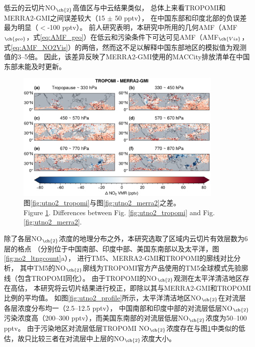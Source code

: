 低云的云切片NO$_{\ch{2}}$高值区与中云结果类似，
总体上来看TROPOMI和MERRA2-GMI之间误差较大（15 $\pm$ 50 pptv），
在中国东部和印度北部的负误差最为明显（$<$-100 pptv）。
前人研究表明，本研究中所用的几何AMF（AMF$_{\ch{geo}}$，式\ref{eq:AMF_geo}）在低云和污染条件下可达可见AMF（AMF$_{\ch{Vis}}$，式\ref{eq:AMF_NO2Vis}）的两倍\citep{BelmonteRivas.2015}，然而这不足以解释中国东部地区的模拟值为观测值的3--5倍。
因此，该差异反映了MERRA2-GMI使用的MACCity排放清单在中国东部未能及时更新。


\begin{figure}[H]
    \centering
    \includegraphics[width=0.9\textwidth]{./figures/utno2_delta.png}
    \caption{
    图\ref{fig:utno2_tropomi}与图\ref{fig:utno2_merra2}之差。 \\
    Figure \ref{fig:utno2_delta}. Differences between Fig. \ref{fig:utno2_tropomi} and Fig. \ref{fig:utno2_merra2}.
    }
    \label{fig:utno2_delta}
\end{figure}



除了各层NO$_{\ch{2}}$浓度的地理分布之外，本研究选取了区域内云切片有效层数为6层的格点
（分别位于中国南部、印度中部、美国东南部以及太平洋，图\ref{fig:no2_ltngcount}a），
进行TM5、MERRA2-GMI和TROPOMI的廓线对比分析，
其中TM5的NO$_{\ch{2}}$廓线为TROPOMI官方产品使用的TM5全球模式先验廓线（包含TROPOMI同化）。
由于TROPOMI的NO$_{\ch{2}}$观测在太平洋清洁地区存在高估，
本研究将云切片结果进行校正，即除以其与MERRA2-GMI和TROPOMI比例的平均值。
如图\ref{fig:utno2_profile}所示，太平洋清洁地区NO$_{\ch{2}}$在对流层各层浓度分布均一（2.5--12.5 pptv），
中国南部和印度中部的对流层低层NO$_{\ch{2}}$污染浓度高（200--300 pptv），而美国东南部的对流层低层NO$_{\ch{2}}$浓度为50--100 pptv。
由于污染地区对流层低层TROPOMI NO$_{\ch{2}}$浓度存在与图\ref{fig:utno2_delta}中类似的低估，故只比较三者在对流层中上层的NO$_{\ch{2}}$浓度大小。


